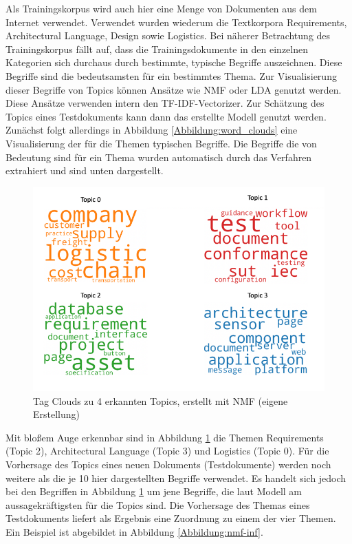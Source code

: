 Als Trainingskorpus wird auch hier eine Menge von Dokumenten aus dem Internet verwendet. Verwendet wurden  wiederum die Textkorpora Requirements, Architectural Language, Design sowie Logistics. Bei näherer Betrachtung des Trainingskorpus fällt auf, dass die Trainingsdokumente in den einzelnen Kategorien sich durchaus durch bestimmte, typische Begriffe auszeichnen. Diese Begriffe sind die bedeutsamsten für ein bestimmtes Thema. Zur Visualisierung dieser Begriffe von Topics können Ansätze wie NMF oder LDA genutzt werden. Diese Ansätze verwenden intern den TF-IDF-Vectorizer. Zur Schätzung des Topics eines Testdokuments kann dann das erstellte Modell genutzt werden. Zunächst folgt allerdings in Abbildung \ref{Abbildung:word_clouds} eine Visualisierung der für die Themen typischen Begriffe. Die Begriffe die von Bedeutung sind für ein Thema wurden automatisch durch das Verfahren extrahiert und sind unten dargestellt.
 
\begin{figure}[h]
\centering
\includegraphics[scale=0.95]{content/pics/Picture_18.png}
\caption{Tag Clouds zu 4 erkannten Topics, erstellt mit NMF (eigene Erstellung)}
\label{Abbildung:word-clouds}
\end{figure}

Mit bloßem Auge erkennbar sind in Abbildung \ref{Abbildung:word-clouds} die Themen Requirements (Topic 2), Architectural Language (Topic 3) und Logistics (Topic 0). Für die Vorhersage des Topics eines neuen Dokuments (Testdokumente) werden noch weitere als die je 10 hier dargestellten Begriffe verwendet. Es handelt sich jedoch bei den Begriffen in Abbildung \ref{Abbildung:word-clouds} um jene Begriffe, die laut Modell am aussagekräftigsten für die Topics sind. Die Vorhersage des Themas eines Testdokuments liefert als Ergebnis eine Zuordnung zu einem der vier Themen. Ein Beispiel ist abgebildet in Abbildung \ref{Abbildung:nmf-inf}.

